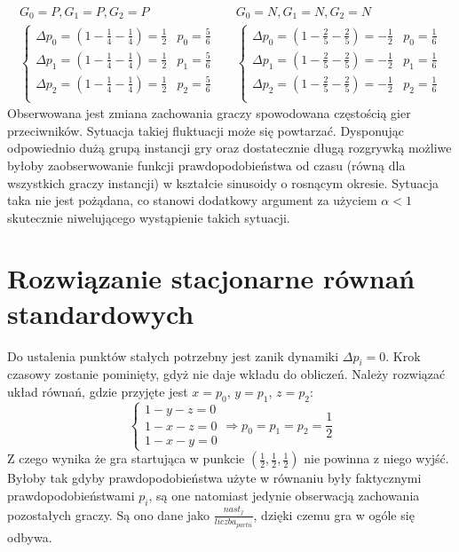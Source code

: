 \begin{align*}
G_0 = P, G_1 = P, G_2 = P && G_0 = N, G_1 = N, G_2 = N \\
\left\{
\begin{array}{cc}
\Delta p_0 = (1 - \frac{1}{4} - \frac{1}{4}) =  \frac{1}{2} & p_0= \frac{5}{6}\\
\Delta p_1 = (1 - \frac{1}{4} - \frac{1}{4}) =  \frac{1}{2} & p_1= \frac{5}{6}\\
\Delta p_2 = (1 - \frac{1}{4} - \frac{1}{4}) =  \frac{1}{2} & p_2= \frac{5}{6}\\
\end{array} 
\right. &&
\left\{
\begin{array}{cc}
\Delta p_0 = (1 - \frac{2}{5} - \frac{2}{5}) =  -\frac{1}{2} & p_0= \frac{1}{6}\\
\Delta p_1 = (1 - \frac{2}{5} - \frac{2}{5}) =  -\frac{1}{2} & p_1= \frac{1}{6}\\
\Delta p_2 = (1 - \frac{2}{5} - \frac{2}{5}) =  -\frac{1}{2} & p_2= \frac{1}{6}\\
\end{array}
\right.
\end{align*}
Obserwowana jest zmiana zachowania graczy spowodowana częstością gier przeciwników. Sytuacja takiej fluktuacji może się powtarzać. Dysponując odpowiednio dużą grupą instancji gry oraz dostatecznie długą rozgrywką możliwe byłoby zaobserwowanie funkcji prawdopodobieństwa od czasu (równą dla wszystkich graczy instancji) w kształcie sinusoidy o rosnącym okresie.
Sytuacja taka nie jest pożądana, co stanowi dodatkowy argument za użyciem $\alpha < 1$ skutecznie niwelującego wystąpienie takich sytuacji.

\section{Rozwiązanie stacjonarne równań standardowych}
\label{sec:stab_stand}
Do ustalenia punktów stałych potrzebny jest zanik dynamiki $\Delta p_i = 0$. Krok czasowy zostanie pominięty, gdyż nie daje wkładu do obliczeń. Należy rozwiązać układ równań, gdzie przyjęte jest $x=p_0$, $y=p_1$, $z=p_2$:
\begin{equation}
\left\{
\begin{array}{c}
1 - y - z = 0 \\
1 - x - z = 0 \\
1 - x - y = 0
\end{array}
\right. \Rightarrow p_0 = p_1 = p_2 = \frac{1}{2}
\end{equation}
Z czego wynika że gra startująca w punkcie $(\frac{1}{2},\frac{1}{2},\frac{1}{2})$ nie powinna z niego wyjść. Byłoby tak gdyby prawdopodobieństwa użyte w równaniu były faktycznymi prawdopodobieństwami $p_i$, są one natomiast jedynie obserwacją zachowania pozostałych graczy. Są ono dane jako $\frac{nast_j}{liczba_{partii}}$, dzięki czemu gra w ogóle się odbywa.
